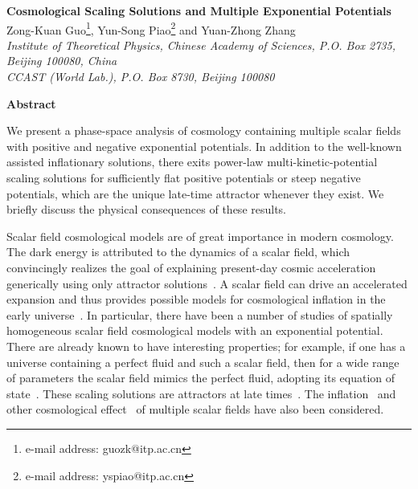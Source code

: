 \documentclass[a4paper,12pt]{article}
\begin{document}
\baselineskip=16pt
\begin{titlepage}
\setcounter{page}{0}
\begin{center}

\vspace{0.5cm} {\Large \bf Cosmological Scaling Solutions and
Multiple Exponential Potentials }\\
\vspace{10mm}
Zong-Kuan Guo\footnote{e-mail address: guozk@itp.ac.cn}\coordHE{},
Yun-Song Piao\footnote{e-mail address: yspiao@itp.ac.cn}\coordHE{}
and
Yuan-Zhong Zhang\coordHE{} \\
\vspace{6mm} {\footnotesize{\it
  \coordHE{}Institute of Theoretical Physics, Chinese Academy of Sciences,
      P.O. Box 2735, Beijing 100080, China\\
  \coordHE{}CCAST (World Lab.), P.O. Box 8730, Beijing 100080\\}}

\vspace*{5mm} \normalsize
\smallskip
\medskip
\smallskip
\end{center}
\vskip0.6in \centerline{\large\bf Abstract} {We present a
phase-space analysis of cosmology containing multiple scalar
fields with positive and negative exponential potentials.
In addition to the well-known assisted inflationary solutions,
there exits power-law multi-kinetic-potential scaling solutions
for sufficiently flat positive potentials or steep negative
potentials, which are the unique late-time attractor whenever they
exist. We briefly discuss the physical consequences of these
results.}

\vspace*{2mm}
\end{titlepage}



Scalar field cosmological models are of great importance in modern
cosmology. The dark energy is attributed to the dynamics of a
scalar field, which convincingly realizes the goal of explaining
present-day cosmic acceleration generically using only attractor
solutions~\cite{CD}. A scalar field can drive an accelerated
expansion and thus provides possible models for cosmological
inflation in the early universe~\cite{GU}. In particular, there
have been a number of studies of spatially homogeneous scalar
field cosmological models with an exponential potential. There are
already known to have interesting properties; for example, if one
has a universe containing a perfect fluid and such a scalar field,
then for a wide range of parameters the scalar field mimics the
perfect fluid, adopting its equation of state~\cite{CL}. These
scaling solutions are attractors at late times~\cite{ST}. The
inflation~\cite{LM, PCZ} and other cosmological effect~\cite{HL}
of multiple scalar fields have also been considered.
\end{document}
